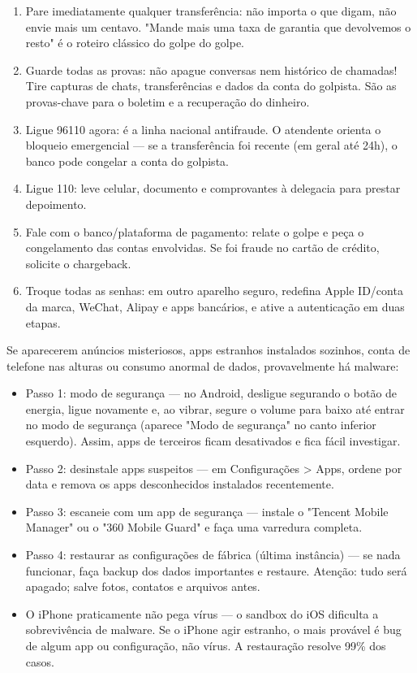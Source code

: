 \begin{enumerate}
  \item Pare imediatamente qualquer transferência: não importa o que digam, não envie mais um centavo. "Mande mais uma taxa de garantia que devolvemos o resto" é o roteiro clássico do golpe do golpe.
  \item Guarde todas as provas: não apague conversas nem histórico de chamadas! Tire capturas de chats, transferências e dados da conta do golpista. São as provas-chave para o boletim e a recuperação do dinheiro.
  \item Ligue 96110 agora: é a linha nacional antifraude. O atendente orienta o bloqueio emergencial — se a transferência foi recente (em geral até 24h), o banco pode congelar a conta do golpista.
  \item Ligue 110: leve celular, documento e comprovantes à delegacia para prestar depoimento.
  \item Fale com o banco/plataforma de pagamento: relate o golpe e peça o congelamento das contas envolvidas. Se foi fraude no cartão de crédito, solicite o chargeback.
  \item Troque todas as senhas: em outro aparelho seguro, redefina Apple ID/conta da marca, WeChat, Alipay e apps bancários, e ative a autenticação em duas etapas.
\end{enumerate}


Se aparecerem anúncios misteriosos, apps estranhos instalados sozinhos, conta de telefone nas alturas ou consumo anormal de dados, provavelmente há malware:

\begin{itemize}
  \item Passo 1: modo de segurança — no Android, desligue segurando o botão de energia, ligue novamente e, ao vibrar, segure o volume para baixo até entrar no modo de segurança (aparece "Modo de segurança" no canto inferior esquerdo). Assim, apps de terceiros ficam desativados e fica fácil investigar.
  \item Passo 2: desinstale apps suspeitos — em Configurações > Apps, ordene por data e remova os apps desconhecidos instalados recentemente.
  \item Passo 3: escaneie com um app de segurança — instale o "Tencent Mobile Manager" ou o "360 Mobile Guard" e faça uma varredura completa.
  \item Passo 4: restaurar as configurações de fábrica (última instância) — se nada funcionar, faça backup dos dados importantes e restaure. Atenção: tudo será apagado; salve fotos, contatos e arquivos antes.
  \item O iPhone praticamente não pega vírus — o sandbox do iOS dificulta a sobrevivência de malware. Se o iPhone agir estranho, o mais provável é bug de algum app ou configuração, não vírus. A restauração resolve 99\% dos casos.
\end{itemize}

